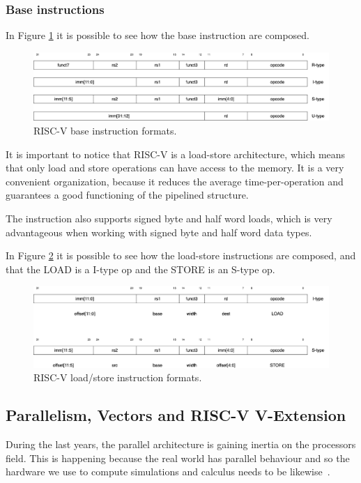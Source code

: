 \subsubsection{Base instructions}
In Figure \ref{riscv-base-instruction-formats} it is possible to see how the base instruction are composed.

\begin{figure}[H]
    \centering
    \includegraphics[scale = 0.27]{Chapter_1/img/riscv-base-instruction-formats.png}
    \caption{RISC-V base instruction formats. \cite{RISC-V-Instruction-Set-Manual}}
    \label{riscv-base-instruction-formats}
\end{figure}

It is important to notice that RISC-V is a load-store architecture, which means that only load and store operations can have access to the memory.
It is a very convenient organization, because it reduces the average time-per-operation and guarantees a good functioning of the pipelined structure.

The instruction also supports signed byte and half word loads, which is very advantageous when working with signed byte and half word data types.

In Figure \ref{riscv-load-store} it is possible to see how the load-store instructions are composed, and that the LOAD is a I-type op and the STORE is an S-type op.

\begin{figure}[H]
    \centering
    \includegraphics[scale = 0.27]{Chapter_1/img/riscv-load-store.png}
    \caption{RISC-V load/store instruction formats. \cite{RISC-V-Instruction-Set-Manual}}
    \label{riscv-load-store}
\end{figure}


\subsection{Parallelism, Vectors and RISC-V V-Extension}
During the last years, the parallel architecture is gaining inertia on the processors field. This is happening because the real world has parallel behaviour and so the hardware we use to compute simulations and calculus needs to be likewise~\cite{Parallel-Computing}.

